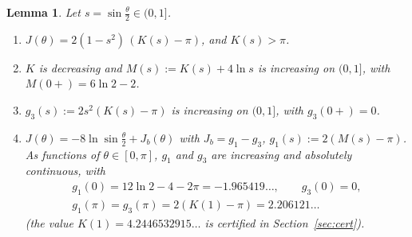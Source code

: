 \documentclass[11pt,a4paper]{article}
\theoremstyle{plain}
\newtheorem{lemma}[theorem]{Lemma}
\theoremstyle{definition}
\numberwithin{equation}{section}
\begin{document}
\begin{lemma}\label{lem:KJ}
Let $s=\sin\frac\theta2\in(0,1]$.
\begin{enumerate}
\item[(a)] $J(\theta)=2(1-s^2)\,(K(s)-\pi)$, and $K(s)>\pi$.
\item[(b)] $K$ is decreasing and $M(s):=K(s)+4\ln s$ is increasing on $(0,1]$, with $M(0+)=6\ln2-2$.
\item[(c)] $g_3(s):=2s^2(K(s)-\pi)$ is increasing on $(0,1]$, with $g_3(0+)=0$.
\item[(d)] $J(\theta)=-8\ln\sin\frac\theta2+J_b(\theta)$ with $J_b=g_1-g_3$, $g_1(s):=2(M(s)-\pi)$. As functions of $\theta\in[0,\pi]$, $g_1$ and $g_3$ are increasing and absolutely continuous, with
\[
\begin{gathered}g_1(0)=12\ln2-4-2\pi=-1.965419\ldots,\qquad g_3(0)=0,\\ g_1(\pi)=g_3(\pi)=2(K(1)-\pi)=2.206121\ldots\end{gathered}
\]
(the value $K(1)=4.2446532915\ldots$ is certified in Section~\ref{sec:cert}).
\end{enumerate}
\end{lemma}
\end{document}
